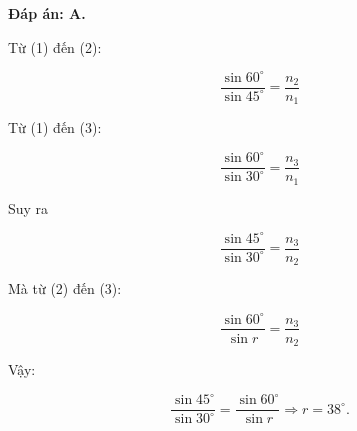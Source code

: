 \begin{enumerate}[label=\bfseries Câu \arabic*:]
{		\textbf{Đáp án: A.}
		
		Từ (1) đến (2):
		
		$$\dfrac{\sin 60^\circ}{\sin 45^\circ} = \dfrac{n_2}{n_1}$$
		
		Từ (1) đến (3):
		
		$$\dfrac{\sin 60^\circ}{\sin 30^\circ} = \dfrac{n_3}{n_1}$$
		
		Suy ra
		
		$$\dfrac{\sin 45^\circ}{\sin 30^\circ} = \dfrac{n_3}{n_2}$$
		
		Mà từ (2) đến (3):
		
		$$\dfrac{\sin 60^\circ}{\sin r} = \dfrac{n_3}{n_2}$$
		
		Vậy:
		
		$$\dfrac{\sin 45^\circ}{\sin 30^\circ} = \dfrac{\sin 60^\circ}{\sin r} \Rightarrow r =38^\circ.$$
		
		
		
	}



\end{enumerate}


